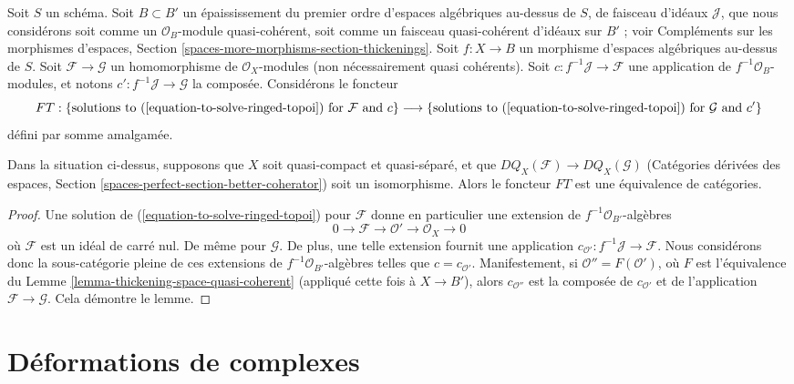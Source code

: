 \noindent
Soit $S$ un schéma. Soit $B \subset B'$ un épaississement du premier ordre
d'espaces algébriques au-dessus de $S$, de faisceau d'idéaux $\mathcal{J}$,
que nous considérons soit comme un $\mathcal{O}_B$-module quasi-cohérent, soit
comme un faisceau quasi-cohérent d'idéaux sur $B'$ ; voir Compléments sur les
morphismes d'espaces, Section
\ref{spaces-more-morphisms-section-thickenings}.
Soit $f : X \to B$ un morphisme d'espaces algébriques au-dessus de $S$.
Soit $\mathcal{F} \to \mathcal{G}$ un homomorphisme de
$\mathcal{O}_X$-modules (non nécessairement quasi cohérents).
Soit $c : f^{-1}\mathcal{J} \to \mathcal{F}$ une application de
$f^{-1}\mathcal{O}_B$-modules, et notons
$c' : f^{-1}\mathcal{J} \to \mathcal{G}$ la composée.
Considérons le foncteur
$$
FT :
\{\text{solutions to }(\ref{equation-to-solve-ringed-topoi})
\text{ for }\mathcal{F}\text{ and }c\}
\longrightarrow
\{\text{solutions to }(\ref{equation-to-solve-ringed-topoi})
\text{ for }\mathcal{G}\text{ and }c'\}
$$
défini par somme amalgamée.

\begin{lemma}
\label{lemma-thickening-over-thickening-space-quasi-coherent}
Dans la situation ci-dessus, supposons que $X$ soit quasi-compact et
quasi-séparé, et que $DQ_X(\mathcal{F}) \to DQ_X(\mathcal{G})$
(Catégories dérivées des espaces, Section
\ref{spaces-perfect-section-better-coherator}) soit un isomorphisme.
Alors le foncteur $FT$ est une équivalence de catégories.
\end{lemma}

\begin{proof}
Une solution de (\ref{equation-to-solve-ringed-topoi}) pour $\mathcal{F}$ donne
en particulier une extension de $f^{-1}\mathcal{O}_{B'}$-algèbres
$$
0 \to \mathcal{F} \to \mathcal{O}' \to \mathcal{O}_X \to 0
$$
où $\mathcal{F}$ est un idéal de carré nul. De même pour $\mathcal{G}$.
De plus, une telle extension fournit une application
$c_{\mathcal{O}'} : f^{-1}\mathcal{J} \to \mathcal{F}$.
Nous considérons donc la sous-catégorie pleine de ces extensions de
$f^{-1}\mathcal{O}_{B'}$-algèbres telles que $c = c_{\mathcal{O}'}$.
Manifestement, si $\mathcal{O}'' = F(\mathcal{O}')$, où $F$ est l'équivalence
du Lemme \ref{lemma-thickening-space-quasi-coherent} (appliqué cette fois à
$X \to B'$), alors $c_{\mathcal{O}''}$ est la composée de
$c_{\mathcal{O}'}$ et de l'application $\mathcal{F} \to \mathcal{G}$.
Cela démontre le lemme.
\end{proof}

\section{Déformations de complexes}
\label{section-deformations-complexes}

